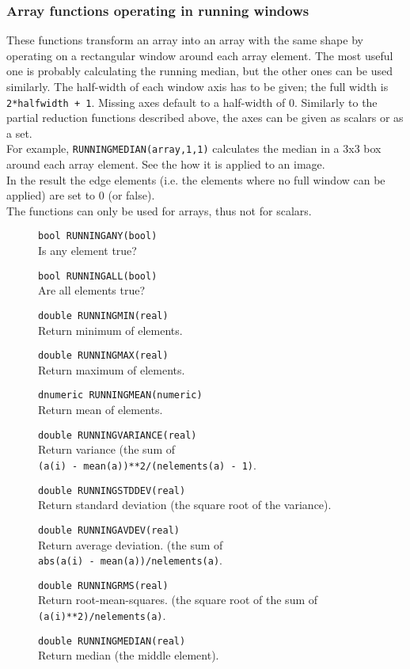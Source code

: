 \subsubsection{Array functions operating in running windows}
These functions transform an array into an array with the same shape
by operating on a rectangular window around each array element.
The most useful one is probably calculating the running median, but
the other ones can be used similarly.
The half-width of each window axis has to be given; the full width is
\texttt{2*halfwidth + 1}. Missing axes default to a half-width of 0.
Similarly to the partial reduction functions described above, the axes
can be given as scalars or as a set.
\\For example,
\texttt{RUNNINGMEDIAN(array,1,1)} calculates the median
in a 3x3 box around each array element.
See the  how it is applied to an image.
\\In the result the edge elements (i.e. the elements where no full
window can be applied) are set to 0 (or false).
\\The functions can only be used for arrays, thus not for scalars.
\begin{description}
  \item[] \texttt{bool RUNNINGANY(bool)}\\
    Is any element true?
  \item[] \texttt{bool RUNNINGALL(bool)}\\
    Are all elements true?
  \item[] \texttt{double RUNNINGMIN(real)}\\
    Return minimum of elements.
  \item[] \texttt{double RUNNINGMAX(real)}\\
    Return maximum of elements.
  \item[] \texttt{dnumeric RUNNINGMEAN(numeric)}\\
    Return mean of elements.
  \item[] \texttt{double RUNNINGVARIANCE(real)}\\
    Return variance (the sum of
    \\\texttt{(a(i) - mean(a))**2/(nelements(a) - 1)}.
  \item[] \texttt{double RUNNINGSTDDEV(real)}\\
    Return standard deviation (the square root of the variance).
  \item[] \texttt{double RUNNINGAVDEV(real)}\\
    Return average deviation. (the sum of 
    \\\texttt{abs(a(i) - mean(a))/nelements(a)}.
  \item[] \texttt{double RUNNINGRMS(real)}\\
    Return root-mean-squares. (the square root of the sum of
    \\\texttt{(a(i)**2)/nelements(a)}.
  \item[] \texttt{double RUNNINGMEDIAN(real)}\\
    Return median (the middle element).
\end{description}

